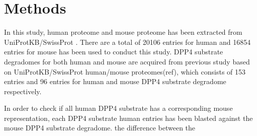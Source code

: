 \section{Methods}
In this study, human proteome and mouse proteome has been extracted from UniProtKB/SwissProt \cite{2007}. There are a total of 20106 entries for human and 16854 entries for mouse has been used to conduct this study. DPP4 substrate degradomes for both human and mouse are acquired from previous study based on UniProtKB/SwissProt human/mouse proteomes(ref), which consists of 153 entries and 96 entries for human and mouse DPP4 substrate degradome respectively. 

In order to check if all human DPP4 substrate has a corresponding mouse representation, each DPP4 substrate human entries has been blasted against the mouse DPP4 substrate degradome.  the difference between the 
 
